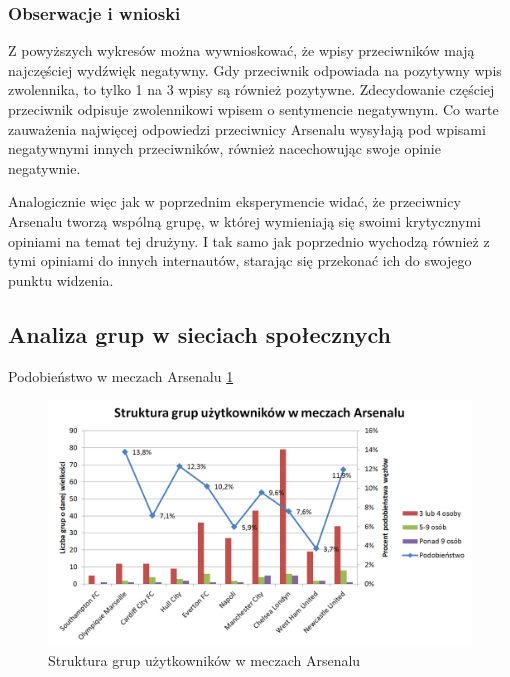 \clearpage
\subsubsection{Obserwacje i wnioski}
Z powyższych wykresów można wywnioskować, że wpisy przeciwników mają najczęściej
wydźwięk negatywny. Gdy przeciwnik odpowiada na pozytywny wpis zwolennika, to tylko
1 na 3 wpisy są również pozytywne. Zdecydowanie częściej przeciwnik odpisuje
zwolennikowi wpisem o sentymencie negatywnym. 
Co warte zauważenia najwięcej odpowiedzi przeciwnicy Arsenalu wysyłają
pod wpisami negatywnymi innych przeciwników, również nacechowując swoje opinie
negatywnie.

Analogicznie więc jak w poprzednim eksperymencie widać, że przeciwnicy
Arsenalu tworzą wspólną grupę, w której wymieniają się swoimi
krytycznymi opiniami na temat tej drużyny. I tak samo jak poprzednio
wychodzą również z tymi opiniami do innych internautów, starając się
przekonać ich do swojego punktu widzenia.
















\clearpage
\subsection{Analiza grup w sieciach społecznych}
Podobieństwo w meczach Arsenalu \ref{image:grupy-arsenal}
 
\begin{figure}[ht!]
\centering
\includegraphics[width=120mm]{img/grupy-arsenal.png}
\caption{Struktura grup użytkowników w meczach Arsenalu}
\label{image:grupy-arsenal}
\end{figure}


